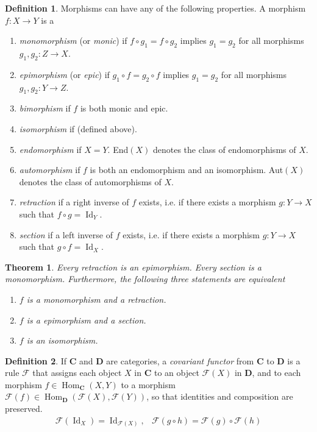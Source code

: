 \documentclass{article}
\DeclareMathOperator{\Id}{Id}
\DeclareMathOperator{\Hom}{Hom}
\newtheorem{theorem}{Theorem}[section]
\theoremstyle{remark}
\theoremstyle{definition}
\newtheorem{definition}{Definition}[section]
\begin{document}
    \begin{definition}
    Morphisms can have any of the following properties. A morphism $f: X \longrightarrow Y$ is a
    \begin{enumerate}
        \item \textit{monomorphism} (or \textit{monic}) if $f \circ g_1 = f \circ g_2$ implies $g_1 = g_2$ for all morphisms $g_1, g_2: Z \longrightarrow X$. 
        \item \textit{epimorphism} (or \textit{epic}) if $g_1 \circ f = g_2 \circ f$ implies $g_1 = g_2$ for all morphisms $g_1, g_2: Y \longrightarrow Z$. 
        \item \textit{bimorphism} if $f$ is both monic and epic. 
        \item \textit{isomorphism} if (defined above). 
        \item \textit{endomorphism} if $X = Y$. End$(X)$ denotes the class of endomorphisms of $X$. 
        \item \textit{automorphism} if $f$ is both an endomorphism and an isomorphism. Aut$(X)$ denotes the class of automorphisms of $X$. 
        \item \textit{retraction} if a right inverse of $f$ exists, i.e. if there exists a morphism $g: Y \longrightarrow X$ such that $f \circ g = \Id_Y$. 
        \item \textit{section} if a left inverse of $f$ exists, i.e. if there exists a morphism $g: Y \longrightarrow X$ such that $g \circ f = \Id_X$. 
    \end{enumerate}
    \end{definition}

    \begin{theorem}
    Every retraction is an epimorphism. Every section is a monomorphism. Furthermore, the following three statements are equivalent
    \begin{enumerate}
        \item $f$ is a monomorphism and a retraction. 
        \item $f$ is a epimorphism and a section. 
        \item $f$ is an isomorphism. 
    \end{enumerate}
    \end{theorem}

    \begin{definition}
    If $\mathbf{C}$ and $\mathbf{D}$ are categories, a \textit{covariant functor} from $\mathbf{C}$ to $\mathbf{D}$ is a rule $\mathcal{F}$ that assigns each object $X$ in $\mathbf{C}$ to an object $\mathcal{F}(X)$ in $\mathbf{D}$, and to each morphism $f \in \Hom_\mathbf{C} (X ,Y)$ to a morphism $\mathcal{F}(f) \in \Hom_\mathbf{D} (\mathcal{F}(X), \mathcal{F}(Y))$, so that identities and composition are preserved.
    \begin{align*}
        \mathcal{F}(\Id_X) = \Id_{\mathcal{F}(X)}, & \mathcal{F}(g \circ h) = \mathcal{F}(g) \circ \mathcal{F} (h)
    \end{align*}
    \end{definition}
\end{document}
